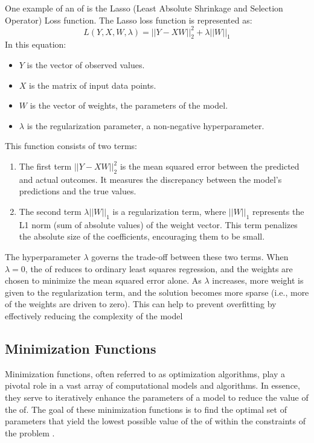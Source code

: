 \documentclass[
  a4paper,  %
  twoside,  %
  bibliography=totoc,
  headsepline,
  cleardoublepage=empty,
  parskip=half,
  draft=false
]{scrbook}
\begin{document}
One example of an \gls{of} is the Lasso (Least Absolute Shrinkage and Selection Operator) Loss function.
The Lasso loss function is represented as:
\[
L(Y, X, W, \lambda) = ||Y - XW||^2_2 + \lambda ||W||_1
\]
In this equation:

\begin{itemize}
  \item \(Y\) is the vector of observed values.
  \item \(X\) is the matrix of input data points.
  \item \(W\) is the vector of weights, the parameters of the model.
  \item \(\lambda\) is the regularization parameter, a non-negative hyperparameter.
\end{itemize}

This function consists of two terms:
\begin{enumerate}
  \item The first term \(||Y - XW||^2_2\) is the mean squared error between the predicted and actual outcomes.
  It measures the discrepancy between the model's predictions and the true values.
  \item The second term \(\lambda ||W||_1\) is a regularization term, where \(||W||_1\) represents the L1 norm (sum of absolute values) of the weight vector.
  This term penalizes the absolute size of the coefficients, encouraging them to be small.
\end{enumerate}
The hyperparameter \(\lambda\) governs the trade-off between these two terms.
When \(\lambda = 0\), the \gls{of} reduces to ordinary least squares regression, and the weights are chosen to minimize the mean squared error alone.
As \(\lambda\) increases, more weight is given to the regularization term, and the solution becomes more sparse (i.e., more of the weights are driven to zero).
This can help to prevent overfitting by effectively reducing the complexity of the model \cite{ShalevShwartz2014}

\subsection{Minimization Functions}
\label{subsec:minimizationFunctions}
Minimization functions, often referred to as optimization algorithms, play a pivotal role in a vast array of computational models and algorithms.
In essence, they serve to iteratively enhance the parameters of a model to reduce the value of the \gls{of}.
The goal of these minimization functions is to find the optimal set of parameters that yield the lowest possible value of the \gls{of} within the constraints of the problem \cite{Nocedal2006}.
\end{document}
